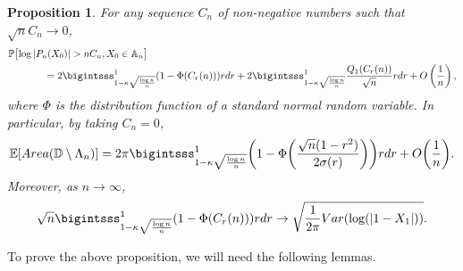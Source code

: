 \documentclass[9pt,a4paper,reqno]{amsart}
\theoremstyle{mine}
\newtheorem{prop}[thm]{Proposition}
\theoremstyle{definition}
\theoremstyle{remark}
\newcommand{\mb}{\mathbb}
\begin{document}
\begin{prop}\label{edgeworth-prop}
    For any sequence $C_n$ of non-negative numbers such that $\sqrt{n}C_n \to 0$, 
    \begin{align}\label{Area-1}
        \mb{P}&\bigl[ \log |P_n(X_0)| > nC_n, X_0 \in \mb{A}_n\bigr] \\& \qquad\quad= 2 \bigintsss_{ 1- \kappa\sqrt{\frac{\log n}{n}}}^1 (1- \Phi(C_r(n)))rdr + 2 \bigintsss_{ 1- \kappa\sqrt{\frac{\log n}{n}}}^1 \frac{Q_1(C_r(n))}{\sqrt{n}}rdr + O\left(\frac{1}{n} \right), \nonumber
    \end{align}
    where $\Phi$ is the distribution function of a standard normal random variable. In particular, by taking $C_n = 0$, 
\begin{equation}\label{Area-2}
 \mb{E}[Area(\mb{D}\setminus \Lambda_n)] = 2 \pi\bigintsss_{ 1- \kappa\sqrt{\frac{\log n}{n}}}^1 \biggl(1- \Phi\biggl(\frac{\sqrt{n}(1-r^2)}{2\sigma(r)}\biggr)\biggr)rdr + O\biggl(\frac{1}{n}\biggr).
\end{equation}
    Moreover, as $n\to \infty$, 
    \begin{equation}\label{gauss-integral-converge}
      \sqrt{n} \bigintsss_{ 1- \kappa\sqrt{\frac{\log n}{n}}}^1 (1- \Phi(C_r(n)))rdr \to   \sqrt{\frac{1}{2\pi}Var(\log(|1-X_1|))}.
    \end{equation}
\end{prop}

\vspace{5mm}
To prove the above proposition, we will need the following lemmas.
\end{document}
